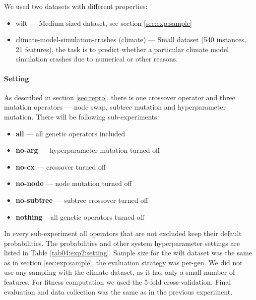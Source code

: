 We used two datasets with different properties:
\begin{itemize}
\item wilt --- Medium sized dataset, see section \ref{sec:exp:sample}
\item climate-model-simulation-crashes (climate) --- Small dataset (540
instances, 21 features), the task is to predict whether a particular
climate model simulation crashes due to numerical or other reasons.
\citep{gmd-6-1157-2013}
\end{itemize}

\paragraph{Setting}

As described in section \ref{sec:repro}, there is one crossover operator and
three mutation operators --- node swap, subtree mutation and hyperparameter
mutation. There will be following sub-experiments:
\begin{itemize}
\setlength\itemsep{0.3em}
\item \textbf{all} --- all genetic operators included
\item \textbf{no-arg} --- hyperparameter mutation turned off
\item \textbf{no-cx} --- crossover turned off
\item \textbf{no-node} --- node mutation turned off
\item \textbf{no-subtree} --- subtree crossover turned off
\item \textbf{nothing} -- all genetic operators turned off
\end{itemize}
In every sub-experiment all operators that are not excluded keep their default
probabilities. The probabilities and other system hyperparameter
settings are listed in Table \ref{tab04:exp2:setting}.
Sample size for the wilt dataset was the same as in section
\ref{sec:exp:sample}, the evaluation strategy was per-gen. We did not use any
sampling with the climate dataset, as it has only a small number of features.
For fitness computation we used the 5-fold cross-validation. Final evaluation
and data collection was the same as in the previous experiment.

